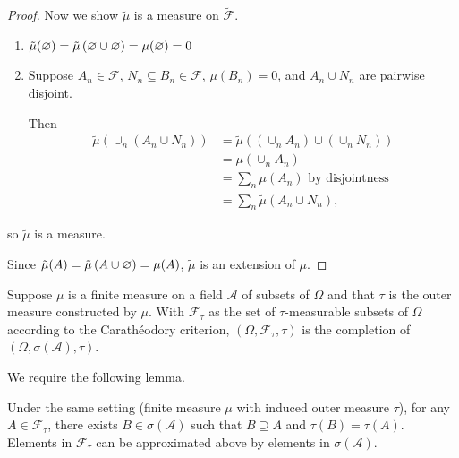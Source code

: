 \begin{proof}
	Now we show $\tilde{\mu}$ is a measure on $\tilde{\mathscr{F}}$. 
	\begin{enumerate}[label=(\roman*)]
		\item $\tilde{\mu}(\varnothing) = \tilde{\mu}\left( \varnothing \cup \varnothing \right) = \mu(\varnothing) = 0$
		\item Suppose $A_n \in \mathscr{F}$, $N_n \subseteq B_n \in \mathscr{F}$, $\mu(B_n) = 0$, and $A_n \cup N_n$ are pairwise disjoint.

			Then 
			\begin{align*}
				\tilde{\mu}\left( \cup_n \left( A_n \cup N_n \right) \right) &= \tilde{\mu}\left( \left( \cup_n A_n \right)\cup \left( \cup_n N_{n} \right) \right) \\
																			 &= \mu\left( \cup_n A_n \right) \\
																			 &= \sum_n \mu(A_n) \text{ by disjointness} \\
																			 &= \sum_n \tilde{\mu}(A_n \cup N_n)
			,\end{align*}
	\end{enumerate}
	so $\tilde{\mu}$ is a measure.

	Since $\tilde{\mu}(A) = \tilde{\mu}\left( A \cup \varnothing \right) = \mu(A)$, $\tilde{\mu}$ is an extension of $\mu$.
\end{proof}

\begin{theorem} \label{4-9-1}
	Suppose $\mu$ is a finite measure on a field $\mathscr{A}$ of subsets of $\Omega$ and that $\tau$ is the outer measure constructed by $\mu$. With $\mathscr{F}_\tau$ as the set of $\tau$-measurable subsets of $\Omega$ according to the Carath\'eodory criterion, $(\Omega, \mathscr{F}_\tau, \tau)$ is the completion of $\left( \Omega, \sigma(\mathscr{A}), \tau \right)$.
\end{theorem}

We require the following lemma.

\begin{lemma}
	Under the same setting (finite measure $\mu$ with induced outer measure $\tau$), for any $A \in \mathscr{F}_\tau$, there exists $B \in \sigma(\mathscr{A})$ such that $B \supseteq A$ and $\tau(B) = \tau(A)$. Elements in $\mathscr{F}_\tau$ can be approximated above by elements in $\sigma(\mathscr{A})$.
\end{lemma}

